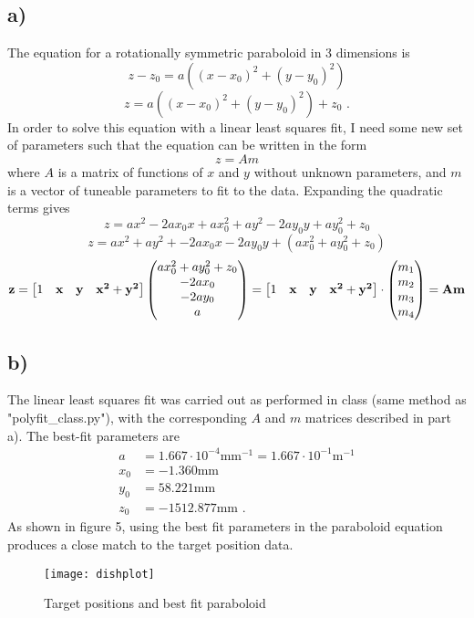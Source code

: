 \documentclass{article}
\newcommand{\<}[1]{\left\langle #1 \right\rangle }
\begin{document}
\subsection{a)}
The equation for a rotationally symmetric paraboloid in 3 dimensions is 
\[z-z_0 = a\left((x-x_0)^2 + (y-y_0)^2\right) \]
\[z = a\left((x-x_0)^2 + (y-y_0)^2\right) + z_0 \text{ .}\]
In order to solve this equation with a linear least squares fit, I need some new set of parameters such that the equation can be written in the form 
\[z = Am\] 
where $A$ is a matrix of functions of $x$ and $y$ without unknown parameters, and $m$ is a vector of tuneable parameters to fit to the data. Expanding the quadratic terms gives
\[z = ax^2 -2ax_0x + ax_0^2 + ay^2 -2ay_0y + ay_0^2 + z_0\]
\[z = ax^2 + ay^2 + -2ax_0x -2ay_0y + (ax_0^2 + ay_0^2 + z_0)\]
\[\vb{z} = 
\begin{bmatrix}
	1 & \vb{x} & \vb{y} & \vb{x^2} + \vb{y^2}
\end{bmatrix}
\begin{pmatrix}
	ax_0^2 + ay_0^2 + z_0\\
	-2ax_0\\
	-2ay_0\\
	a
\end{pmatrix}
 = 
\begin{bmatrix}
	1 & \vb{x} & \vb{y} & \vb{x^2} + \vb{y^2}
\end{bmatrix} \cdot 
\begin{pmatrix}
	m_1\\
	m_2\\
	m_3\\
	m_4\\
\end{pmatrix}
= \vb{A}\vb{m}
\]

\subsection{b)}
The linear least squares fit was carried out as performed in class (same method as "polyfit\_class.py"), with the corresponding $A$ and $m$ matrices described in part a). The best-fit parameters are
\begin{align*}
	a &= 1.667\cdot10^{-4} \text{mm}^{-1} = 1.667\cdot10^{-1} \text{m}^{-1}\\
	x_0 &= -1.360 \text{mm}\\
	y_0 &= 58.221 \text{mm}\\
	z_0 &= -1512.877 \text{mm .}
\end{align*}
As shown in figure 5, using the best fit parameters in the paraboloid equation produces a close match to the target position data.
\begin{figure}[h]
	\caption{Target positions and best fit paraboloid}
	\centering
	\texttt{[image: dishplot]}
\end{figure}
\end{document}
